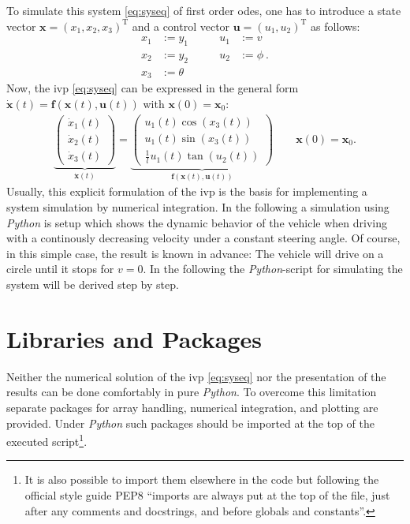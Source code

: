 \documentclass[a4paper,11pt,headinclude=true,headsepline,parskip=half,DIV=13]{scrartcl}
\newcommand{\py}{\emph{Python}\xspace}
\newcommand{\uu}{\mathbf{u}}
\newcommand{\f}{\mathbf{f}}
\newcommand{\x}{\mathbf{x}}
\newcommand{\xZero}{\mathbf{x}_0}
\begin{document}
To simulate this system \eqref{eq:syseq} of first order \glspl{ode}, one has to introduce a state vector $\x=(x_1,x_2,x_3)^\mathrm{T}$ and a control vector $\uu=(u_1,u_2)^\mathrm{T}$ as follows:
\begin{subequations}
\begin{alignat}{2}
x_1 &:= y_1 &\qquad u_1 &:= v\\
x_2 &:= y_2 &\qquad  u_2 &:= \phi \:. \\
x_3 &:= \theta
\end{alignat}
\end{subequations}
Now, the \gls{ivp} \eqref{eq:syseq} can be expressed in the general form $\dot{\x}(t)=\f(\x(t),\uu(t))$ with $\x(0) = \xZero$:
\label{eq:ss_system}
\begin{align} \label{eq:odesys}
\underbrace{\begin{pmatrix} \dot{x}_1(t) \\ \dot{x}_2(t) \\ \dot{x}_3(t) \end{pmatrix}}_{\dot{\x}(t)} = \underbrace{\begin{pmatrix}  u_1(t) \cos(x_3(t)) \\ u_1(t) \sin(x_3(t)) \\ \frac{1}{l}u_1(t) \tan(u_2(t)) \end{pmatrix}}_{\f(\x(t),\uu(t))} \qquad \x(0) = \xZero.
\end{align}
Usually, this explicit formulation of the \gls{ivp} is the basis for implementing a system simulation by numerical integration. In the following a simulation using \py is setup which shows the dynamic behavior of the vehicle when driving with a continously decreasing velocity under a constant steering angle. Of course, in this simple case, the result is known in advance: The vehicle will drive on a circle until it stops for $v = 0$. In the following the \py-script for simulating the system will be derived step by step.


\section{Libraries and Packages}
Neither the numerical solution of the \gls{ivp} \eqref{eq:syseq} nor the presentation of the results can be done comfortably in pure \py. To overcome this limitation separate packages for array handling, numerical integration, and plotting are provided. Under \py such packages should be imported at the top of the executed script\footnote{It is also possible to import them elsewhere in the code but following the official style guide PEP8 ``imports are always put at the top of the file, just after any comments and docstrings, and before globals and constants''.}.
\end{document}
